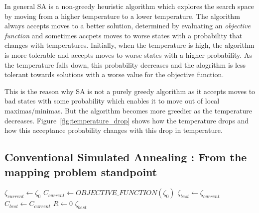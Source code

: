 In general SA is a non-greedy heuristic algorithm which explores the search
space by moving from a higher temperature to a lower temperature. The algorithm
always accepts moves to a better solution, determined by evaluating an
\textit{objective function} and sometimes accpets moves to worse states with a
probability that changes with temperatures. Initially, when the temperature is
high, the algorithm is more tolerable and accepts moves to worse states with a
higher probability. As the temperature falls down, this probability decreases
and the alogrithm is less tolerant towards solutions with a worse value for the
objective function.

This is the reason why SA is not a purely greedy algorithm as it accepts moves
to bad states with some probability which enables it to move out of local
maximas/minimas. But the algorithm becomes more greedier as the temperature
decreases. Figure~\ref{fig:temperature_drop} shows how the temperature drops and
how this acceptance probability changes with this drop in temperature.

\subsection{Conventional Simulated Annealing : From the mapping problem standpoint}

\begin{algorithm}[h!]
\caption{$Simulated\_Annealing(\zeta_0, \mathcal{T}_0)$}
\label{algo:SA}
{}
$\zeta_{current} \leftarrow \zeta_0$ \;
$C_{current} \leftarrow OBJECTIVE\_FUNCTION(\zeta_0)$ \;
$\zeta_{best} \leftarrow \zeta_{current}$\;
$C_{best} \leftarrow C_{current}$\;
$R \leftarrow 0$\;
\Return $\zeta_{best}$
\end{algorithm}

